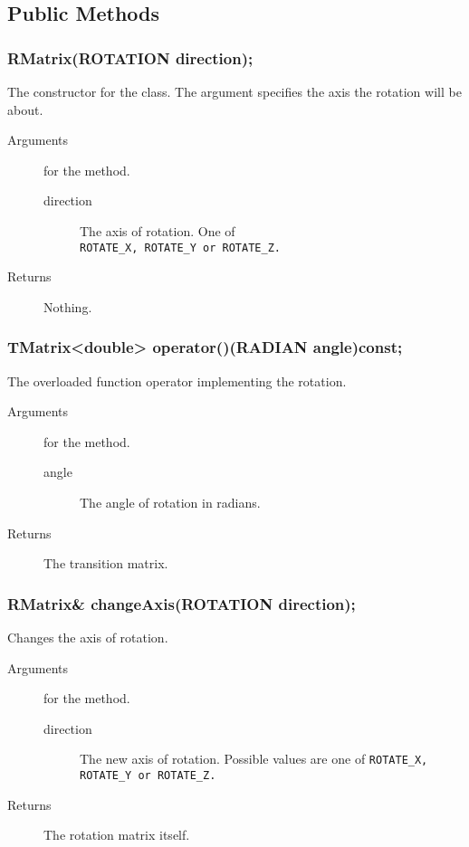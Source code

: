 \subsection{Public Methods}
\subsubsection{RMatrix(ROTATION direction);}
The constructor for the class. The argument specifies the axis 
the rotation will be about.
 \begin{description}
    \item [Arguments] for the method.
      \begin{description}
        \item [direction] The axis of rotation. One of \\
                       \tt ROTATE\_X\rm, \tt ROTATE\_Y \tt or 
                       \tt ROTATE\_Z\rm.
      \end{description}
    \item [Returns] Nothing.
 \end{description}
\subsubsection{TMatrix<double> operator()(RADIAN angle)const;}
The overloaded function operator implementing the rotation.
 \begin{description}
    \item [Arguments] for the method.
      \begin{description}
         \item [angle] The angle of rotation in radians.
      \end{description}
    \item [Returns] The transition matrix.
 \end{description}
\subsubsection{RMatrix\& changeAxis(ROTATION direction);}
Changes the axis of rotation.

 \begin{description}
    \item [Arguments] for the method.
      \begin{description}
        \item [direction] The new axis of rotation. Possible values are
                          one of \tt ROTATE\_X\rm, \tt ROTATE\_Y \rm
                          or \tt ROTATE\_Z\rm. 
      \end{description}
     \item [Returns] The rotation matrix itself.
  \end{description}

